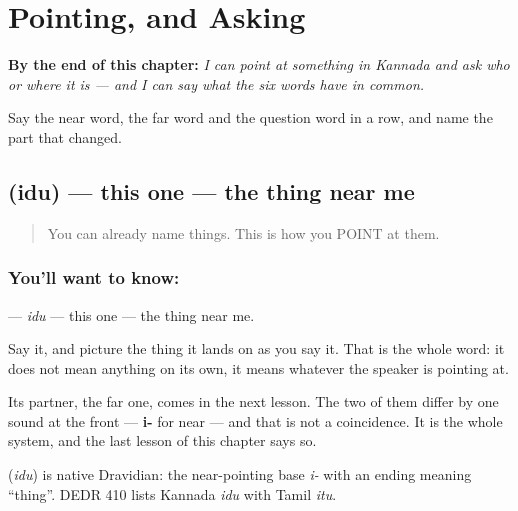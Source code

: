 
\chapter{Pointing, and Asking}
\label{ch:kn-pointing-and-asking}

\begin{chapteropening}
\textbf{By the end of this chapter:} \emph{I can point at something in Kannada and ask who or where it is — and I can say what the six words have in common.}

Say the near word, the far word and the question word in a row, and name the part that changed.
\end{chapteropening}

\section[\texorpdfstring{\kn{ಇದು} (idu)}{ಇದು (idu)}]{ (idu) — this one — the thing near me}

\label{lesson:KA-C41-this}



\begin{quote}
You can already name things. This is how you POINT at them.
\end{quote}

\subsection*{You'll want to know: }
\textbf{} — \emph{idu} — this one — the thing near me.

Say it, and picture the thing it lands on as you say it. That is the whole word: it does not mean anything on its own, it means whatever the speaker is pointing at.

Its partner, the far one, comes in the next lesson. The two of them differ by one sound at the front — \textbf{i-} for near — and that is not a coincidence. It is the whole system, and the last lesson of this chapter says so.

\begin{cousinweb}
\textbf{} (\emph{idu}) is native Dravidian: the near-pointing base \emph{i-} with an ending meaning \textquotedblleft{}thing\textquotedblright{}. DEDR 410 lists Kannada \emph{idu} with Tamil \emph{itu}.
\end{cousinweb}

